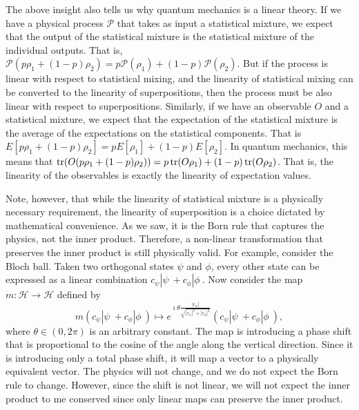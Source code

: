 The above insight also tells us why quantum mechanics is a linear theory. If we have a physical process $\mathcal{P}$ that takes as input a statistical mixture, we expect that the output of the statistical mixture is the statistical mixture of the individual outputs. That is, $\mathcal{P}(p\rho_1 + (1-p) \rho_2) = p \mathcal{P}(\rho_1) + (1-p) \mathcal{P}(\rho_2)$. But if the process is linear with respect to statistical mixing, and the linearity of statistical mixing can be converted to the linearity of superpositions, then the process must be also linear with respect to superpositions. Similarly, if we have an observable $O$ and a statistical mixture, we expect that the expectation of the statistical mixture is the average of the expectations on the statistical components. That is $E[p\rho_1 + (1-p) \rho_2] = pE[\rho_1] + (1-p) E[\rho_2]$. In quantum mechanics, this means that $\operatorname{tr}(O(p\rho_1 + (1-p) \rho_2)) = p\operatorname{tr}(O\rho_1) + (1-p) \operatorname{tr}(O\rho_2)$. That is, the linearity of the observables is exactly the linearity of expectation values.

Note, however, that while the linearity of statistical mixture is a physically necessary requirement, the linearity of superposition is a choice dictated by mathematical convenience. As we saw, it is the Born rule that captures the physics, not the inner product. Therefore, a non-linear transformation that preserves the inner product is still physically valid. For example, consider the Bloch ball. Taken two orthogonal states $\psi$ and $\phi$, every other state can be expressed as a linear combination $c_{\psi} | \psi \> + c_{\phi} | \phi \>$. Now consider the map $m : \mathcal{H} \to \mathcal{H}$ defined by
\begin{equation}
	m(c_{\psi} | \psi \> + c_{\phi} | \phi \>) \mapsto e^{\imath \theta \frac{|c_{\phi}|}{\sqrt{|c_{\psi}|^2+|c_{\phi}|^2}}} ( c_{\psi} | \psi \> + c_{\phi}  | \phi \>),
\end{equation}
where $\theta \in (0,2\pi)$ is an arbitrary constant. The map is introducing a phase shift that is proportional to the cosine of the angle along the vertical direction. Since it is introducing only a total phase shift, it will map a vector to a physically equivalent vector. The physics will not change, and we do not expect the Born rule to change. However, since the shift is not linear, we will not expect the inner product to me conserved since only linear maps can preserve the inner product.

